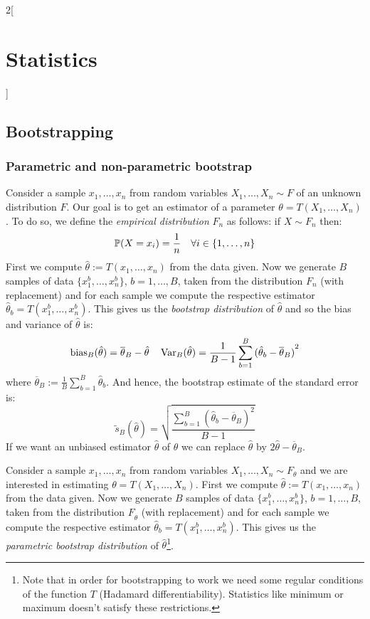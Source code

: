 \documentclass[../../../main.tex]{subfiles}
\begin{document}
\begin{multicols}{2}[\section{Statistics}]
  \subsection{Bootstrapping}
  \subsubsection{Parametric and non-parametric bootstrap}
  \begin{definition}
    Consider a sample $x_1,\ldots,x_n$ from \iid random variables $X_1,\ldots,X_n\sim F$ of an unknown distribution $F$. Our goal is to get an estimator of a parameter $\theta=T(X_1,\ldots,X_n)$. To do so, we define the \emph{empirical distribution} $F_n$ as follows: if $X\sim F_n$ then: $$\mathbb{P}(X=x_i)=\frac{1}{n}\quad\forall i\in\{1,\ldots,n\}$$ First we compute ${\hat\theta}:=T(x_1,\ldots,x_n)$ from the data given.
    Now we generate $B$ samples of data $\{{x_1^b},\ldots,{x_n^b}\}$, $b=1,\ldots,B$, taken from the distribution $F_n$ (with replacement) and for each sample we compute the respective estimator ${\hat\theta}_b=T({x_1^b},\ldots,{x_n^b})$. This gives us the \emph{bootstrap distribution} of ${\hat\theta}$ and so the bias and variance of ${\hat\theta}$ is:
    $$\operatorname{bias}_B({\hat\theta})=\overline{\theta}_B-{\hat\theta}\quad\operatorname{Var}_B({\hat\theta})=\frac{1}{B-1}\sum_{b=1}^B{({\hat\theta}_b-\overline{\theta}_B)}^2$$
    where $\overline{\theta}_B:=\frac{1}{B}\sum_{b=1}^B{\hat\theta}_b$. And hence, the bootstrap estimate of the standard error is:
    $$\tilde{s}_B(\hat\theta)=\sqrt{\frac{\sum_{b=1}^B{({\hat\theta}_b-\overline{\theta}_B)}^2}{B-1}}$$
    If we want an unbiased estimator ${\hat\theta}$ of $\theta$ we can replace ${\hat\theta}$ by $2{\hat\theta}-\overline{\theta}_B$.
  \end{definition}
  \begin{definition}
    Consider a sample $x_1,\ldots,x_n$ from \iid random variables $X_1,\ldots,X_n\sim F_{\theta}$ and we are interested in estimating $\theta=T(X_1,\ldots,X_n)$. First we compute ${\hat\theta}:=T(x_1,\ldots,x_n)$ from the data given.
    Now we generate $B$ samples of data $\{{x_1^b},\ldots,{x_n^b}\}$, $b=1,\ldots,B$, taken from the distribution $F_{{\hat\theta}}$ (with replacement) and for each sample we compute the respective estimator ${\hat\theta}_b=T({x_1^b},\ldots,{x_n^b})$. This gives us the \emph{parametric bootstrap distribution} of ${\hat\theta}$\footnote{Note that in order for bootstrapping to work we need some regular conditions of the function $T$ (Hadamard differentiability). Statistics like minimum or maximum doesn't satisfy these restrictions.}.
  \end{definition}

\end{multicols}
\end{document}
